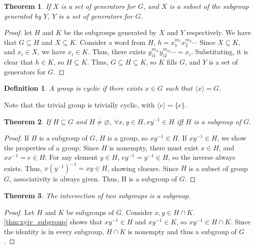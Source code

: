 \documentclass{article}
\newtheorem{theorem}{Theorem}[section]
\newtheorem{definition}{Definition}[section]
\begin{document}
\begin{theorem}
    If $X$ is a set of generators for $G$,
    and $X$ is a subset of the subgroup generated by $Y$,
    $Y$ is a set of generators for $G$.
\end{theorem}
\begin{proof}
    let $H$ and $K$ be the subgroups generated by $X$ and $Y$ respectively.
    We have that $G \subseteq H$ and $X \subseteq K$.
    Consider a word from $H$, $h = x_{1}^{m_{1}}x_{2}^{m_{2}}\cdots$
    Since $X \subseteq K$, and $x_i \in X$, we have $x_i \in K$.
    Thus, there exists $y_{i1}^{m_{i1}}y_{i2}^{m_{i2}}\cdots = x_i$.
    Substituting, it is clear that $h \in K$, so $H \subseteq K$.
    Thus, $G \subseteq H \subseteq K$, so $K$ fills $G$,
    and $Y$ is a set of generators for $G$.
\end{proof}

\begin{definition}
    A group is \emph{cyclic} if there exists $x \in G$ such that $\langle x\rangle = G$.
\end{definition}

Note that the trivial group is trivially cyclic, with $\langle e\rangle = \{e\}$.

\begin{theorem}
    \label{thm:xyiv_subgroup}
    If $H \subseteq G$ and $H \ne \varnothing$,
    $\forall x,y \in H, xy^{-1} \in H$
    iff $H$ is a subgroup of $G$.
\end{theorem}
\begin{proof}
    If $H$ is a subgroup of $G$, $H$ is a group,
    so $xy^{-1} \in H$.
    If $xy^{-1} \in H$, we show the properties of a group:
    Since $H$ is nonempty, there must exist $x \in H$,
    and $xx^{-1} = e \in H$;
    For any element $y \in H$, $ey^{-1} = y^{-1} \in H$,
    so the inverse always exists.
    Thus, $x(y^{-1})^{-1} = xy \in H$, showing closure.
    Since $H$ is a subset of group $G$, associativity is always given.
    Thus, H is a subgroup of $G$.
\end{proof}

\begin{theorem}
    The intersection of two subgroups is a subgroup.
\end{theorem}
\begin{proof}
    Let $H$ and $K$ be subgroups of $G$.
    Consider $x,y \in H \cap K$.
    \autoref{thm:xyiv_subgroup} shows that
    $xy^{-1} \in H$ and $xy^{-1} \in K$,
    so $xy^{-1} \in H \cap K$.
    Since the identity is in every subgroup,
    $H \cap K$ is nonempty and thus a subgroup of $G$.
\end{proof}
\end{document}
